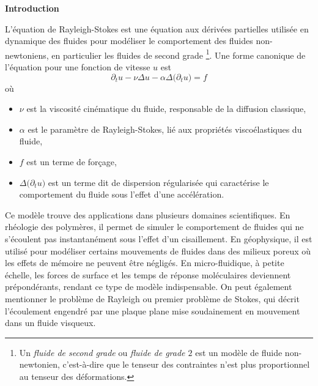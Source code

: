
\thispagestyle{empty}
\vspace*{1cm}

\begin{center}
    \Large\textbf{Introduction}
\end{center}

L'équation de Rayleigh-Stokes est une équation aux dérivées partielles utilisée en dynamique des fluides pour modéliser le comportement des fluides non-newtoniens, en particulier les fluides de second grade \footnote{Un \textit{fluide de second grade} ou \textit{fluide de grade $2$} est un modèle de fluide non-newtonien, c'est-à-dire que le tenseur des contraintes n'est plus proportionnel au tenseur des déformations.}. Une forme canonique de l'équation pour une fonction de vitesse $u$ est
\begin{equation*}
    \partial_t u - \nu \Delta u - \alpha \Delta \big(\partial_t u\big) = f
\end{equation*}
où
\begin{itemize}
    \item $\nu$ est la viscosité cinématique du fluide, responsable de la diffusion classique,
    \item $\alpha$ est le paramètre de Rayleigh-Stokes, lié aux propriétés viscoélastiques du fluide,
    \item $f$ est un terme de forçage,
    \item $\Delta \big(\partial_t u\big)$ est un terme dit de \og dispersion régularisée \fg{} qui caractérise le comportement du fluide sous l'effet d'une accélération.
\end{itemize}
Ce modèle trouve des applications dans plusieurs domaines scientifiques. En rhéologie des polymères, il permet de simuler le comportement de fluides qui ne s'écoulent pas instantanément sous l'effet d'un cisaillement. En géophysique, il est utilisé pour modéliser certains mouvements de fluides dans des milieux poreux où les effets de mémoire ne peuvent être négligés. En micro-fluidique, à petite échelle, les forces de surface et les temps de réponse moléculaires deviennent prépondérants, rendant ce type de modèle indispensable. On peut également mentionner le problème de Rayleigh ou premier problème de Stokes, qui décrit l'écoulement engendré par une plaque plane mise soudainement en mouvement dans un fluide visqueux.
